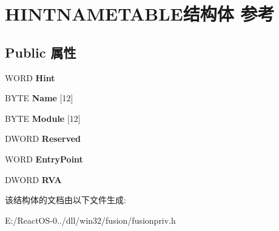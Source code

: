 \hypertarget{struct_h_i_n_t_n_a_m_e_t_a_b_l_e}{}\section{H\+I\+N\+T\+N\+A\+M\+E\+T\+A\+B\+L\+E结构体 参考}
\label{struct_h_i_n_t_n_a_m_e_t_a_b_l_e}
\subsection*{Public 属性}
\begin{DoxyCompactItemize}
\item 
\mbox{\label{struct_h_i_n_t_n_a_m_e_t_a_b_l_e_ac1015d8878bf3cb84c23e1e51ba0f225}} 
W\+O\+RD {\bfseries Hint}
\item 
\mbox{\label{struct_h_i_n_t_n_a_m_e_t_a_b_l_e_ad1ad79b65b915031c3d8ffc0bde28ecc}} 
B\+Y\+TE {\bfseries Name} \mbox{[}12\mbox{]}
\item 
\mbox{\label{struct_h_i_n_t_n_a_m_e_t_a_b_l_e_aa946d440952af74b204271a4e2db702b}} 
B\+Y\+TE {\bfseries Module} \mbox{[}12\mbox{]}
\item 
\mbox{\label{struct_h_i_n_t_n_a_m_e_t_a_b_l_e_a32b35c1572eb66784dc8bbfba6561f8c}} 
D\+W\+O\+RD {\bfseries Reserved}
\item 
\mbox{\label{struct_h_i_n_t_n_a_m_e_t_a_b_l_e_aef0b98074a0920805d9417fe5bd74293}} 
W\+O\+RD {\bfseries Entry\+Point}
\item 
\mbox{\label{struct_h_i_n_t_n_a_m_e_t_a_b_l_e_af690e9b11a9c09b9e5b944be22477ce8}} 
D\+W\+O\+RD {\bfseries R\+VA}
\end{DoxyCompactItemize}


该结构体的文档由以下文件生成\+:\begin{DoxyCompactItemize}
\item 
E\+:/\+React\+O\+S-\/0../dll/win32/fusion/fusionpriv.\+h\end{DoxyCompactItemize}
